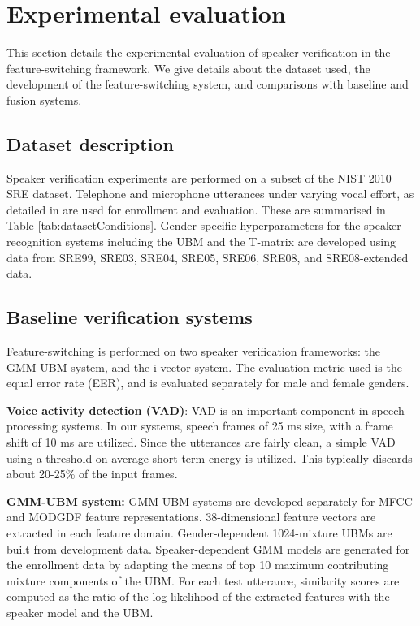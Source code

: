 \documentclass[preprint,12pt,5p]{elsarticle}
\begin{document}
\section{Experimental evaluation}
\label{sec:expts}
This section details the experimental evaluation of speaker verification in the
feature-switching framework. We give details about the dataset used, the
development of the feature-switching system, and comparisons with baseline and
fusion systems.

\subsection{Dataset description}
\label{sec:dB}
Speaker verification experiments are performed on a subset of
the NIST 2010 SRE dataset. Telephone and microphone utterances under varying 
vocal effort, as detailed in \cite{nist2010SRE} are used for enrollment and 
evaluation. These are summarised in Table \ref{tab:datasetConditions}. 
Gender-specific hyperparameters for the speaker recognition systems including 
the UBM and the T-matrix are developed using data 
from SRE99, SRE03, SRE04, SRE05, SRE06, SRE08, and SRE08-extended data.

\subsection{Baseline verification systems}
\label{subsec:baseline}
Feature-switching is performed on two speaker verification frameworks: the GMM-UBM system, 
and the i-vector system. The evaluation
metric used is the equal error rate (EER), and is evaluated separately
for male and female genders.

\vspace{2mm}
\textbf{Voice activity detection (VAD)}: VAD is an important component in speech
processing systems. In our systems, speech frames of 25 ms size, with a frame
shift of 10 ms are utilized. Since the utterances are fairly clean, a simple VAD
using a threshold on average short-term energy is utilized. This typically
discards about 20-25\% of the input frames.

\textbf{GMM-UBM system:} GMM-UBM systems are developed separately for 
MFCC and MODGDF feature representations. 38-dimensional feature vectors are 
extracted in each feature domain. Gender-dependent 1024-mixture UBMs are built 
from development data.  Speaker-dependent GMM models are generated for the 
enrollment data by adapting the means of top 10 maximum contributing mixture 
components of the UBM. For each test utterance, similarity scores are computed 
as the ratio of the log-likelihood of the extracted features with the speaker
model and the UBM.
\end{document}
